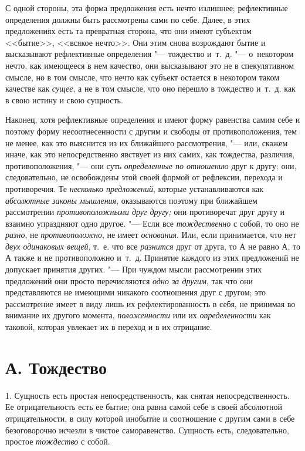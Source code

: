 С одной стороны, эта форма предложения есть нечто излишнее; рефлективные
определения должны быть рассмотрены сами по себе. Далее, в этих
предложениях есть та превратная сторона, что они имеют субъектом <<бытие>>,
<<всякое нечто>>. Они этим снова возрождают бытие и высказывают рефлективные
определения "--- тождество и~т.~д. "--- о~некотором нечто, как имеющееся в нем
качество, они высказывают это не в спекулятивном смысле, но в том смысле,
что нечто как субъект остается в некотором таком качестве как
{\em сущее}, а не в том смысле, что оно перешло в
тождество и~т.~д. как в свою истину и свою сущность.

Наконец, хотя рефлективные определения и имеют форму равенства самим себе и
поэтому форму несоотнесенности с другим и свободы от противоположения, тем
не менее, как это выяснится из их ближайшего рассмотрения, "--- или, скажем
иначе, как это непосредственно явствует из них самих, как тождества,
различия, противоположения, "--- они суть
{\em определенные по отношению} друг к другу; они,
следовательно, не освобождены этой своей формой от рефлексии, перехода и
противоречия. Те {\em несколько предложений}, которые
устанавливаются как {\em абсолютные законы мышления},
оказываются поэтому при ближайшем рассмотрении
{\em противоположными друг другу;} они противоречат
друг другу и взаимно упраздняют одно другое. "--- Если все
{\em тождественно} с собой, то оно не {\em разно}, не
{\em противоположно}, не имеет {\em основания}. Или, если принимается, что нет
{\em двух одинаковых вещей}, т.~е. что все
{\em разнится} друг от друга, то $А$ не равно
$А$, то $А$ также и не противоположно и~т.~д. Принятие
каждого из этих предложений не допускает принятия других. "--- При чуждом
мысли рассмотрении этих предложений они просто перечисляются
{\em одно за другим}, так что они представляются не
имеющими никакого соотношения друг с другом; это рассмотрение имеет в виду
лишь их рефлектированность в себя, не принимая во внимание их другого
момента, {\em положенности} или их
{\em определенности} как таковой, которая увлекает их в
переход и в их отрицание.

\section[А. Тождество]{А. Тождество}
1. Сущность есть простая непосредственность, как
снятая непосредственность. Ее отрицательность есть ее бытие; она равна
самой себе в своей абсолютной отрицательности, в силу которой инобытие и
соотношение с другим сами в себе безоговорочно исчезли в чистое
саморавенство. Сущность есть, следовательно, простое
{\em тождество} с собой.

